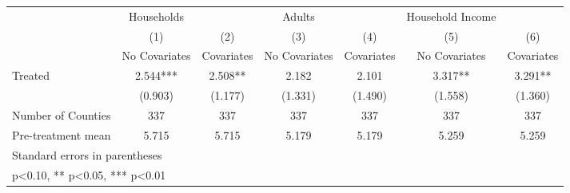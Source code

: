 {
\def\sym#1{\ifmmode^{#1}\else\(^{#1}\)\fi}
\begin{tabular}{l*{6}{c}}
\hline\hline
            &  Households   &               &      Adults   &               &Household Income   &               \\
            &\multicolumn{1}{c}{(1)}&\multicolumn{1}{c}{(2)}&\multicolumn{1}{c}{(3)}&\multicolumn{1}{c}{(4)}&\multicolumn{1}{c}{(5)}&\multicolumn{1}{c}{(6)}\\
            &\multicolumn{1}{c}{No Covariates}&\multicolumn{1}{c}{Covariates}&\multicolumn{1}{c}{No Covariates}&\multicolumn{1}{c}{Covariates}&\multicolumn{1}{c}{No Covariates}&\multicolumn{1}{c}{Covariates}\\
\hline
Treated     &       2.544***&       2.508** &       2.182   &       2.101   &       3.317** &       3.291** \\
            &     (0.903)   &     (1.177)   &     (1.331)   &     (1.490)   &     (1.558)   &     (1.360)   \\
\hline
Number of Counties&         337   &         337   &         337   &         337   &         337   &         337   \\
Pre-treatment mean&       5.715   &       5.715   &       5.179   &       5.179   &       5.259   &       5.259   \\
\hline\hline
\multicolumn{7}{l}{\footnotesize Standard errors in parentheses}\\
\multicolumn{7}{l}{\footnotesize * p<0.10, ** p<0.05, *** p<0.01}\\
\end{tabular}
}
